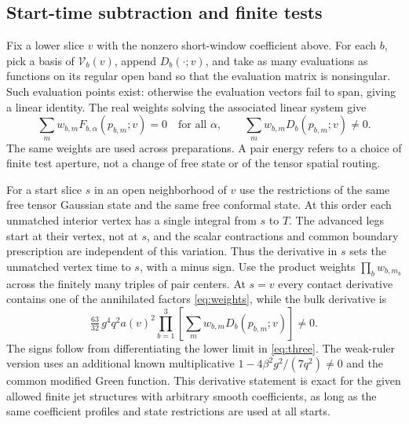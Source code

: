 \subsection{Start-time subtraction and finite tests}
Fix a lower slice \(v\) with the nonzero short-window coefficient above. For each \(b\), pick a basis of \(\mathcal V_b(v)\), append \(D_b(\cdot;v)\), and take as many evaluations as functions on its regular open band so that the evaluation matrix is nonsingular. Such evaluation points exist: otherwise the evaluation vectors fail to span, giving a linear identity. The real weights solving the associated linear system give
\begin{equation}
 \sum_m w_{b,m}F_{b,\alpha}(p_{b,m};v)=0\quad\text{for all }\alpha,
 \qquad
 \sum_m w_{b,m}D_b(p_{b,m};v)\ne0 .
 \label{eq:weights}
\end{equation}
The same weights are used across preparations. A pair energy refers to a choice of finite test aperture, not a change of free state or of the tensor spatial routing.

For a start slice \(s\) in an open neighborhood of \(v\) use the restrictions of the same free tensor Gaussian state and the same free conformal state. At this order each unmatched interior vertex has a single integral from \(s\) to \(T\). The advanced legs start at their vertex, not at \(s\), and the scalar contractions and common boundary prescription are independent of this variation. Thus the derivative in \(s\) sets the unmatched vertex time to \(s\), with a minus sign. Use the product weights \(\prod_b w_{b,m_b}\) across the finitely many triples of pair centers. At \(s=v\) every contact derivative contains one of the annihilated factors \eqref{eq:weights}, while the bulk derivative is
\begin{equation}
 \tfrac{63}{32}\,g^4 q^2 a(v)^2
   \prod_{b=1}^3\left[\sum_m w_{b,m}D_b(p_{b,m};v)\right]\ne0 .
 \label{eq:nullsignal}
\end{equation}
The signs follow from differentiating the lower limit in \eqref{eq:three}. The weak-ruler version uses an additional known multiplicative \(1-4\beta^2g^2/(7q^2)\ne0\) and the common modified Green function. This derivative statement is exact for the given allowed finite jet structures with arbitrary smooth coefficients, as long as the same coefficient profiles and state restrictions are used at all starts.

